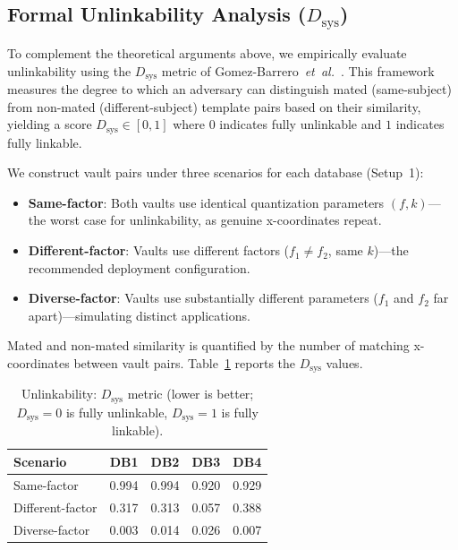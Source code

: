 \documentclass[3p,twocolumn]{elsarticle}
\begin{document}
\subsection{Formal Unlinkability Analysis ($D_{\text{sys}}$)}
\label{sec:dsys}

To complement the theoretical arguments above, we empirically evaluate unlinkability using the $D_{\text{sys}}$ metric of Gomez-Barrero~\textit{et~al.}~\cite{gomezbarrero2017}. This framework measures the degree to which an adversary can distinguish mated (same-subject) from non-mated (different-subject) template pairs based on their similarity, yielding a score $D_{\text{sys}} \in [0, 1]$ where $0$ indicates fully unlinkable and $1$ indicates fully linkable.

We construct vault pairs under three scenarios for each database (Setup~1):
\begin{itemize}
    \item \textbf{Same-factor}: Both vaults use identical quantization parameters $(f, k)$---the worst case for unlinkability, as genuine x-coordinates repeat.
    \item \textbf{Different-factor}: Vaults use different factors ($f_1 \neq f_2$, same $k$)---the recommended deployment configuration.
    \item \textbf{Diverse-factor}: Vaults use substantially different parameters ($f_1$ and $f_2$ far apart)---simulating distinct applications.
\end{itemize}

Mated and non-mated similarity is quantified by the number of matching x-coordinates between vault pairs. Table~\ref{tab:dsys} reports the $D_{\text{sys}}$ values.

\begin{table}[t]
\centering
\caption{Unlinkability: $D_{\text{sys}}$ metric (lower is better; $D_{\text{sys}} = 0$ is fully unlinkable, $D_{\text{sys}} = 1$ is fully linkable).}
\label{tab:dsys}
\begin{tabular}{@{}l c c c c@{}}
\toprule
\textbf{Scenario} & \textbf{DB1} & \textbf{DB2} & \textbf{DB3} & \textbf{DB4} \\
\midrule
Same-factor     & 0.994 & 0.994 & 0.920 & 0.929 \\
Different-factor & 0.317 & 0.313 & 0.057 & 0.388 \\
Diverse-factor   & 0.003 & 0.014 & 0.026 & 0.007 \\
\bottomrule
\end{tabular}
\end{table}
\end{document}
